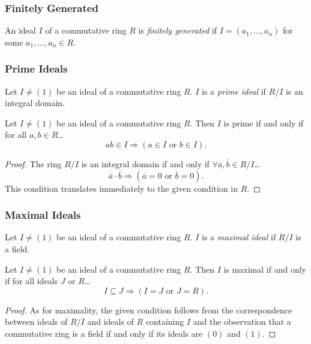 \subsubsection{Finitely Generated}\label{finitelygenerated}
An ideal $I$ of a commutative ring $R$ is \emph{finitely generated} if $I = (a_1,\dots,a_n)$ for some $a_1, \dots, a_n \in R$.

\subsubsection{Prime Ideals}\label{primeideal}
Let $I \neq (1)$ be an ideal of a commutative ring $R$. $I$ is a \emph{prime ideal} if $R/I$ is an integral domain.

\begin{proposition}
\label{primeidealcharacterization}
Let $I \neq (1)$ be an ideal of a commutative ring $R$. Then $I$ is prime if and only if for all $a,b \in R$\dots
$$ab \in I \Rightarrow (a \in I \textrm{ or } b \in I).$$
\end{proposition}

\begin{proof}
The ring $R/I$ is an integral domain if and only if $\forall \overline{a}, \overline{b} \in R/I$\dots
$$\overline{a} \cdot \overline{b} \Rightarrow (\overline{a} = 0 \textrm{ or } \overline{b} = 0).$$
This condition translates immediately to the given condition in $R$.
\end{proof}

\subsubsection{Maximal Ideals}\label{maximalideal}
Let $I \neq (1)$ be an ideal of a commutative ring $R$. $I$ is a \emph{maximal ideal} if $R/I$ is a field.

\begin{proposition}
\label{maximalidealcharacterization}
Let $I \neq (1)$ be an ideal of a commutative ring $R$. Then $I$ is maximal if and only if for all ideals $J$ or $R$\dots
$$I \subseteq J \Rightarrow (I=J \textrm{ or } J=R).$$
\end{proposition}

\begin{proof}
As for maximality, the given condition follows from the correspondence between ideals of $R/I$ and ideals of $R$ containing $I$
and the observation that a commutative ring is a field if and only if its ideals are $(0)$ and $(1)$.
\end{proof}